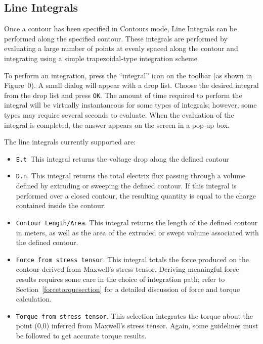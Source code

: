 \documentclass[12pt]{report}
\begin{document}
\subsection{Line Integrals}

Once a contour has been specified in Contours mode, Line Integrals can be
performed along the specified contour. These integrals are performed by
evaluating a large number of points at evenly spaced along the contour and
integrating using a simple trapezoidal-type integration scheme.

To perform an integration, press the ``integral'' icon on the
toolbar (as shown in Figure~0). A small dialog will appear with a
drop list. Choose the desired integral from the drop list and press
\texttt{OK}. The amount of time required to perform the integral
will be virtually instantaneous for some types of integrals;
however, some types may require several seconds to evaluate. When
the evaluation of the integral is completed, the answer appears on
the screen in a pop-up box.

The line integrals currently supported are:


\begin{itemize}


\item \texttt{E.t }This integral returns the voltage drop along the defined
contour

\item \texttt{D.n}. This integral returns the total electrix flux passing through
a volume defined by extruding or sweeping the defined contour. If this
integral is performed over a closed contour, the resulting quantity is equal
to the charge contained inside the contour.

\item \texttt{Contour Length/Area}. This integral returns the length of the
defined contour in meters, as well as the area of the extruded or swept
volume associated with the defined contour.

\item \texttt{Force from stress tensor}. This integral totals the force produced
on the contour derived from Maxwell's stress tensor. Deriving
meaningful force results requires some care in the choice of
integration path; refer to Section~\ref{forcetorquesection} for a
detailed discussion of force and torque calculation.

\item \texttt{Torque from stress tensor}. This selection integrates the torque
about the point (0,0) inferred from Maxwell's stress tensor. Again,
some guidelines must be followed to get accurate torque results.

\end{itemize}
\end{document}
